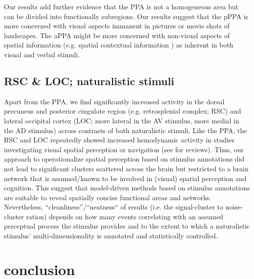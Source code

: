 \documentclass[english]{article}
\begin{document}
Our results add further evidence that the PPA is not a homogeneous area but can
be divided into functionally subregions.
Our results suggest that the pPPA is more concerned with visual aspects immanent
in pictures or movie shots of landscapes.
The aPPA might be more concerned with non-visual aspects of spatial information
(e.g. spatial contextual information \citep{aminoff2013role,
aminoff2015associative, baumann2016functional}) as inherent in both visual and
verbal stimuli.

\subsection{RSC \& LOC; naturalistic stimuli}

Apart from the PPA, we find significantly increased activity in the dorsal
precuneus and posterior cingulate region (e.g. retrosplenial complex; RSC) and
lateral occipital cortex (LOC; more lateral in the AV stimulus, more medial in
the AD stimulus) across contrasts of both naturalistic stimuli.
Like the PPA, the RSC and LOC repeatedly showed increased hemodynamic activity
in studies investigating visual spatial perception or navigation (see
\citep{chrastil2018heterogeneity, bettencourt2013role} for reviews).
Thus, our approach to operationalize spatial perception based on stimulus
annotations did not lead to significant clusters scattered across the brain but
restricted to a brain network that is assumed/known to be involved in (visual)
spatial perception and cognition.
%
This suggest that model-driven methods based on stimulus annotations are
suitable to reveal spatially concise functional areas and networks.
%
Nevertheless, ``cleanliness''/``neatness``  of results (i.e. the signal-cluster
to noise-cluster ration) depends on how many
events correlating with an assumed perceptual process the stimulus provides
and to the extent to which a naturalistic stimulus' multi-dimensionality is
annotated and statistically controlled.


\section{conclusion}
\end{document}
